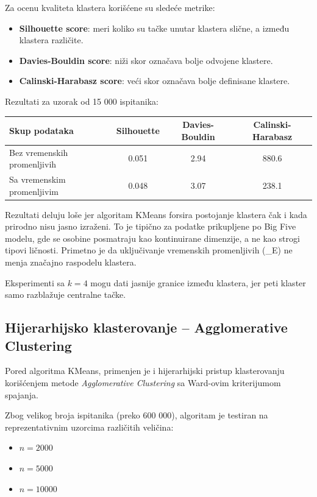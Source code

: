 \documentclass[12pt,a4paper]{article}
\begin{document}
Za ocenu kvaliteta klastera korišćene su sledeće metrike:

\begin{itemize}
    \item \textbf{Silhouette score}: meri koliko su tačke unutar klastera slične, a između klastera različite.
    \item \textbf{Davies-Bouldin score}: niži skor označava bolje odvojene klastere.
    \item \textbf{Calinski-Harabasz score}: veći skor označava bolje definisane klastere.
\end{itemize}

Rezultati za uzorak od 15 000 ispitanika:

\begin{center}
\begin{tabular}{lccc}
\toprule
Skup podataka & Silhouette & Davies-Bouldin & Calinski-Harabasz \\
\midrule
Bez vremenskih promenljivih & 0.051 & 2.94 & 880.6 \\
Sa vremenskim promenljivim & 0.048 & 3.07 & 238.1 \\
\bottomrule
\end{tabular}
\end{center}

Rezultati deluju loše jer algoritam KMeans forsira postojanje klastera čak i kada prirodno nisu jasno izraženi. To je tipično za podatke prikupljene po Big Five modelu, gde se osobine posmatraju kao kontinuirane dimenzije, a ne kao strogi tipovi ličnosti.
Primetno je da uključivanje vremenskih promenljivih (\_E) ne menja značajno raspodelu klastera.

 
Eksperimenti sa $k=4$ mogu dati jasnije granice između klastera, jer peti klaster samo razblažuje centralne tačke.


\subsection{Hijerarhijsko klasterovanje – Agglomerative Clustering}

Pored algoritma KMeans, primenjen je i hijerarhijski pristup klasterovanju korišćenjem metode \textit{Agglomerative Clustering} sa Ward-ovim kriterijumom spajanja.

Zbog velikog broja ispitanika (preko 600 000), algoritam je testiran na reprezentativnim uzorcima različitih veličina:
\begin{itemize}
    \item $n = 2000$
    \item $n = 5000$
    \item $n = 10000$
\end{itemize}
\end{document}
